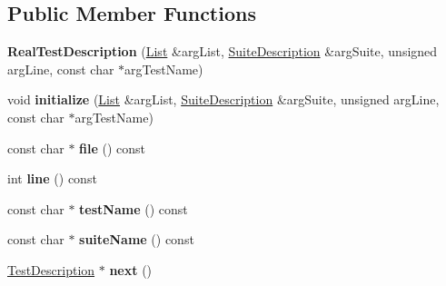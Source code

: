 \subsection*{Public Member Functions}
\begin{DoxyCompactItemize}
\item 
\hypertarget{classCxxTest_1_1RealTestDescription_a782d34c38e6d497f548e3e2870d145b8}{{\bfseries Real\-Test\-Description} (\hyperlink{structCxxTest_1_1List}{List} \&arg\-List, \hyperlink{classCxxTest_1_1SuiteDescription}{Suite\-Description} \&arg\-Suite, unsigned arg\-Line, const char $\ast$arg\-Test\-Name)}\label{classCxxTest_1_1RealTestDescription_a782d34c38e6d497f548e3e2870d145b8}

\item 
\hypertarget{classCxxTest_1_1RealTestDescription_a3eda0429edc58d8c44d7b7df5017ae61}{void {\bfseries initialize} (\hyperlink{structCxxTest_1_1List}{List} \&arg\-List, \hyperlink{classCxxTest_1_1SuiteDescription}{Suite\-Description} \&arg\-Suite, unsigned arg\-Line, const char $\ast$arg\-Test\-Name)}\label{classCxxTest_1_1RealTestDescription_a3eda0429edc58d8c44d7b7df5017ae61}

\item 
\hypertarget{classCxxTest_1_1RealTestDescription_a16fc2c0179ca70ba2b23586b187a45d4}{const char $\ast$ {\bfseries file} () const }\label{classCxxTest_1_1RealTestDescription_a16fc2c0179ca70ba2b23586b187a45d4}

\item 
\hypertarget{classCxxTest_1_1RealTestDescription_ab9757bea6d43b1e86309758bd335dad4}{int {\bfseries line} () const }\label{classCxxTest_1_1RealTestDescription_ab9757bea6d43b1e86309758bd335dad4}

\item 
\hypertarget{classCxxTest_1_1RealTestDescription_ab6e304d94ebde5d63e60e6d423d4693a}{const char $\ast$ {\bfseries test\-Name} () const }\label{classCxxTest_1_1RealTestDescription_ab6e304d94ebde5d63e60e6d423d4693a}

\item 
\hypertarget{classCxxTest_1_1RealTestDescription_a06f549af82bb3b95685b41f8e2f9fa87}{const char $\ast$ {\bfseries suite\-Name} () const }\label{classCxxTest_1_1RealTestDescription_a06f549af82bb3b95685b41f8e2f9fa87}

\item 
\hypertarget{classCxxTest_1_1RealTestDescription_a7ab5d44b33af24b9146d1d08c1e916c0}{\hyperlink{classCxxTest_1_1TestDescription}{Test\-Description} $\ast$ {\bfseries next} ()}\label{classCxxTest_1_1RealTestDescription_a7ab5d44b33af24b9146d1d08c1e916c0}


\end{DoxyCompactItemize}

